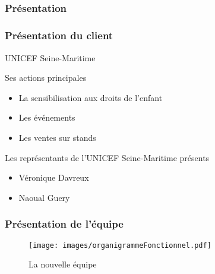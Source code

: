 \subsection{} %

\speaker{\Pierre}
\begin{frame}
\frametitle{Présentation}
	\frametitle{Présentation du client}
	\begin{center}
		UNICEF Seine-Maritime
	\end{center}

	\begin{block}{Ses actions principales}
		\begin{itemize}
			\item La sensibilisation aux droits de l'enfant
			\item Les événements 
			\item Les ventes sur stands
		\end{itemize}
	\end{block}

	\begin{block}{Les représentants de l'UNICEF Seine-Maritime présents}
		\begin{itemize}
			\item Véronique Davreux
			\item Naoual Guery
		\end{itemize}
	\end{block}
\end{frame}

\begin{frame}
\frametitle{Présentation de l'équipe}
	\begin{figure}[!h]
		\begin{center}
			\texttt{[image: images/organigrammeFonctionnel.pdf]}
			\caption{La nouvelle équipe}
		\end{center}
	\end{figure}
\end{frame}
